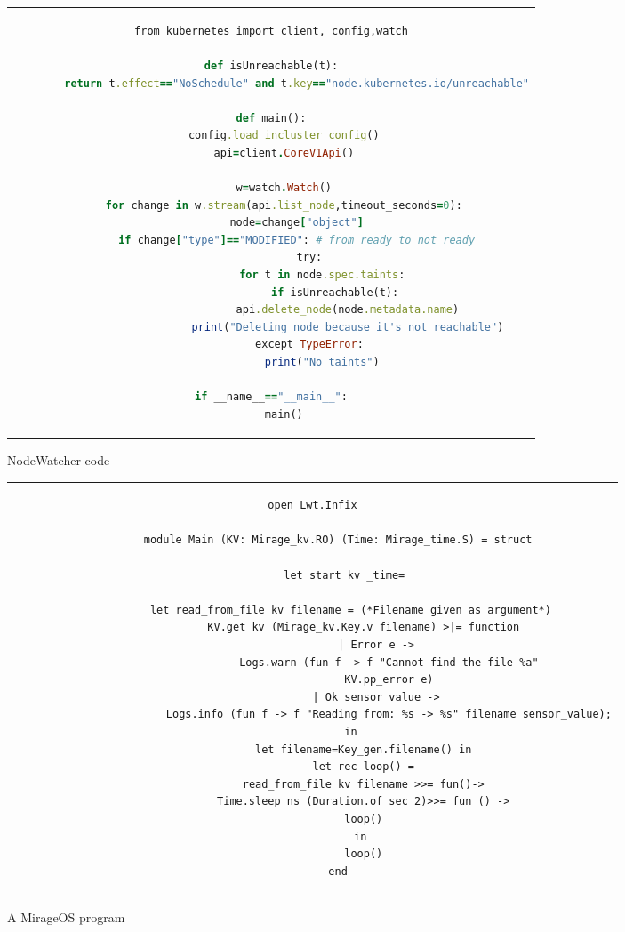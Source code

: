 \begin{code}[htpb]
    \centering
    \begin{tabular}{c}
    \begin{lstlisting}[language=ruby]
from kubernetes import client, config,watch

def isUnreachable(t):
        return t.effect=="NoSchedule" and t.key=="node.kubernetes.io/unreachable"
        
def main():
    config.load_incluster_config()
    api=client.CoreV1Api()
    
    w=watch.Watch()
    for change in w.stream(api.list_node,timeout_seconds=0):
        node=change["object"]
        if change["type"]=="MODIFIED": # from ready to not ready
            try:
                for t in node.spec.taints:
                    if isUnreachable(t):
                        api.delete_node(node.metadata.name)
                        print("Deleting node because it's not reachable")
            except TypeError:
                print("No taints")

if __name__=="__main__":
    main()

\end{lstlisting}
\end{tabular}
\caption{NodeWatcher code}\label{fig:nodewatcher}
\end{code}

\begin{code}[htpb]
    \centering
    \begin{tabular}{c}
    \begin{lstlisting}[language=caml,showstringspaces=false,breaklines=true,upquote=true]
        open Lwt.Infix

        module Main (KV: Mirage_kv.RO) (Time: Mirage_time.S) = struct
        
          let start kv _time=
        
            let read_from_file kv filename = (*Filename given as argument*)
                KV.get kv (Mirage_kv.Key.v filename) >|= function
                    | Error e ->
                        Logs.warn (fun f -> f "Cannot find the file %a"
                        KV.pp_error e)
                    | Ok sensor_value ->
                        Logs.info (fun f -> f "Reading from: %s -> %s" filename sensor_value);
            in
                let filename=Key_gen.filename() in
                let rec loop() =
                read_from_file kv filename >>= fun()->
                Time.sleep_ns (Duration.of_sec 2)>>= fun () ->
                loop()
                in 
                loop()
        end
  \end{lstlisting}
  \end{tabular}
  \caption{A MirageOS program}\label{fig:ocaml-demo}
\end{code}


\iffalse
  \begin{figure}
    \centering
    \texttt{[image: rasp-running.jpeg]}
    \caption{Photo of wiring of \ref{fig:rpi-diagram}}\label{fig:wiring}
  \end{figure}
\fi